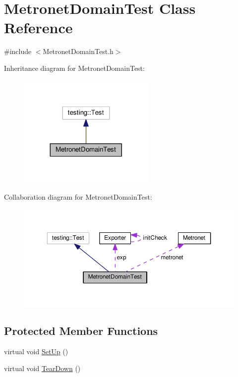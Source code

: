 \hypertarget{class_metronet_domain_test}{}\section{Metronet\+Domain\+Test Class Reference}
\label{class_metronet_domain_test}


{\ttfamily \#include $<$Metronet\+Domain\+Test.\+h$>$}



Inheritance diagram for Metronet\+Domain\+Test\+:\nopagebreak
\begin{figure}[H]
\begin{center}
\leavevmode
\includegraphics[width=188pt]{class_metronet_domain_test__inherit__graph}
\end{center}
\end{figure}


Collaboration diagram for Metronet\+Domain\+Test\+:\nopagebreak
\begin{figure}[H]
\begin{center}
\leavevmode
\includegraphics[width=350pt]{class_metronet_domain_test__coll__graph}
\end{center}
\end{figure}
\subsection*{Protected Member Functions}
\begin{DoxyCompactItemize}
\item 
virtual void \hyperlink{class_metronet_domain_test_ac8e8d15b45d53810c4427084fad6388f}{Set\+Up} ()
\item 
virtual void \hyperlink{class_metronet_domain_test_a3429b373771815652c80d013f81369a0}{Tear\+Down} ()
\end{DoxyCompactItemize}
